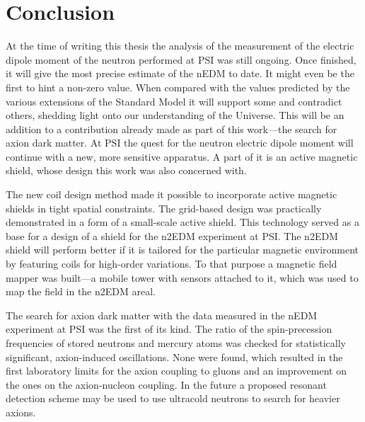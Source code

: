 
\begingroup

\let\clearpage\relax
\let\cleardoublepage\relax
\let\cleardoublepage\relax

\chapter*{Conclusion}
At the time of writing this thesis the analysis of the measurement of the electric dipole moment of the neutron performed at PSI was still ongoing. Once finished, it will give the most precise estimate of the nEDM to date. It might even be the first to hint a non-zero value. When compared with the values predicted by the various extensions of the Standard Model it will support some and contradict others, shedding light onto our understanding of the Universe. This will be an addition to a contribution already made as part of this work---the search for axion dark matter. At PSI the quest for the neutron electric dipole moment will continue with a new, more sensitive apparatus. A part of it is an active magnetic shield, whose design this work was also concerned with.

The new coil design method made it possible to incorporate active magnetic shields in tight spatial constraints. The grid-based design was practically demonstrated in a form of a small-scale active shield. This technology served as a base for a design of a shield for the n2EDM experiment at PSI\@. The n2EDM shield will perform better if it is tailored for the particular magnetic environment by featuring coils for high-order variations. To that purpose a magnetic field mapper was built---a mobile tower with sensors attached to it, which was used to map the field in the n2EDM areal.

The search for axion dark matter with the data measured in the nEDM experiment at PSI was the first of its kind. The ratio of the spin-precession frequencies of stored neutrons and mercury atoms was checked for statistically significant, axion-induced oscillations. None were found, which resulted in the first laboratory limits for the axion coupling to gluons and an improvement on the ones on the axion-nucleon coupling. In the future a proposed resonant detection scheme may be used to use ultracold neutrons to search for heavier axions.

\endgroup